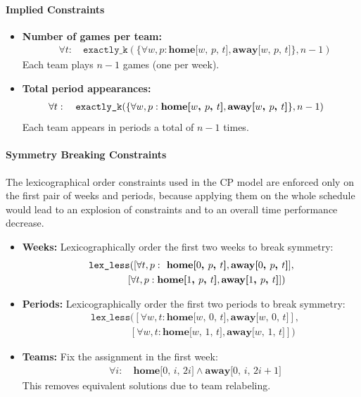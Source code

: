 \documentclass[11pt]{article}
\begin{document}
\paragraph{Implied Constraints}
\begin{itemize}
    \item \textbf{Number of games per team:}
    \begin{align*}
        &\forall t: \quad \texttt{exactly\_k}(\{\forall w,p: \textbf{home[$w$, $p$, $t$]}, \textbf{away[$w$, $p$, $t$]}\}, n-1)
    \end{align*}
    Each team plays $n-1$ games (one per week).

    \item \textbf{Total period appearances:}
    \begin{align*}
        &\forall t: \quad \texttt{exactly\_k}(\{\forall w,p: \space \textbf{home[$w$, $p$, $t$]}, \textbf{away[$w$, $p$, $t$]}\}, n-1)
    \end{align*}
    Each team appears in periods a total of $n-1$ times.
\end{itemize}

\paragraph{Symmetry Breaking Constraints}
The lexicographical order constraints used in the CP model are enforced only on the first pair of weeks and periods, because applying them on the whole schedule would lead to an explosion of constraints and to an overall time performance decrease.
\begin{itemize}
    \item \textbf{Weeks:} Lexicographically order the first two weeks to break symmetry:
\begin{align*}
    &\texttt{lex\_less}(
        [\forall t, p:\space\textbf{ home[$0$, $p$, $t$]}, \textbf{away[$0$, $p$, $t$]}], \\
    &\quad\quad\quad\quad
        [\forall t, p: \textbf{home[$1$, $p$, $t$]}, \textbf{away[$1$, $p$, $t$]}]
    )
\end{align*}

\item \textbf{Periods:} Lexicographically order the first two periods to break symmetry:
\begin{align*}
    &\texttt{lex\_less}(
        [\forall w, t : \textbf{home[$w$, $0$, $t$]}, \textbf{away[$w$, $0$, $t$]}], \\
    &\quad\quad\quad\quad
        [\forall w, t: \textbf{home[$w$, $1$, $t$]}, \textbf{away[$w$, $1$, $t$]}]
    )
\end{align*}


    \item \textbf{Teams:} Fix the assignment in the first week:
    \begin{align*}
        &\forall i: \quad \textbf{home[$0$, $i$, $2i$]} \land \textbf{away[$0$, $i$, $2i+1$]}
    \end{align*}
    This removes equivalent solutions due to team relabeling.
\end{itemize}
\end{document}

